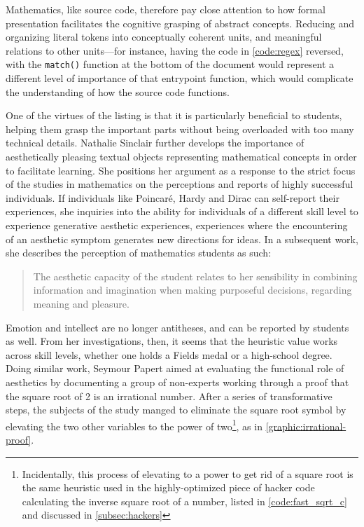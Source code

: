 Mathematics, like source code, therefore pay close attention to how formal presentation facilitates the cognitive grasping of abstract concepts. Reducing and organizing literal tokens into conceptually coherent units, and meaningful relations to other units—for instance, having the code in \ref{code:regex} reversed, with the \lstinline{match()} function at the bottom of the document would represent a different level of importance of that entrypoint function, which would complicate the understanding of how the source code functions.

One of the virtues of the listing is that it is particularly beneficial to students, helping them grasp the important parts without being overloaded with too many technical details. Nathalie Sinclair further develops the importance of aesthetically pleasing textual objects representing mathematical concepts in order to facilitate learning. She positions her argument as a response to the strict focus of the studies in mathematics on the perceptions and reports of highly successful individuals. If individuals like Poincaré, Hardy and Dirac can self-report their experiences, she inquiries into the ability for individuals of a different skill level to experience generative aesthetic experiences, experiences where the encountering of an aesthetic symptom generates new directions for ideas. In a subsequent work, she describes the perception of mathematics students as such:

\begin{quote}
    The aesthetic capacity of the student relates to her sensibility in combining information and imagination when making purposeful decisions, regarding meaning and pleasure. \citep{sinclair_aesthetic_2011}
\end{quote}

Emotion and intellect are no longer antitheses, and can be reported by students as well. From her investigations, then, it seems that the heuristic value works across skill levels, whether one holds a Fields medal or a high-school degree. Doing similar work, Seymour Papert aimed at evaluating the functional role of aesthetics by documenting a group of non-experts working through a proof that the square root of 2 is an irrational number. After a series of transformative steps, the subjects of the study manged to eliminate the square root symbol by elevating the two other variables to the power of two\footnote{Incidentally, this process of elevating to a power to get rid of a square root is the same heuristic used in the highly-optimized piece of hacker code calculating the inverse square root of a number, listed in \ref{code:fast_sqrt_c} and discussed in \ref{subsec:hackers}}, as in \ref{graphic:irrational-proof}.

